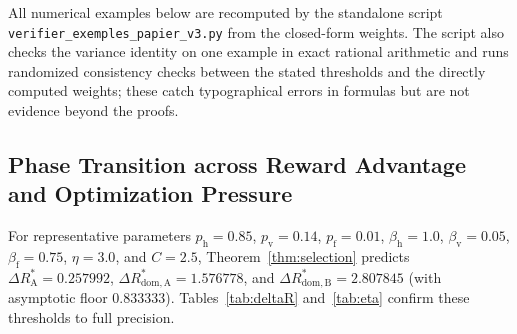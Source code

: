 \documentclass[11pt,a4paper]{article}
\begin{document}
{\sloppy All numerical examples below are recomputed by the standalone script \texttt{verifier\_exemples\_papier\_v3.py} from the closed-form weights. The script also checks the variance identity on one example in exact rational arithmetic and runs randomized consistency checks between the stated thresholds and the directly computed weights; these catch typographical errors in formulas but are not evidence beyond the proofs.\par}

\subsection{Phase Transition across Reward Advantage and Optimization Pressure}

For representative parameters $p_{\mathrm{h}} = 0.85$, $p_{\mathrm{v}} = 0.14$, $p_{\mathrm{f}} = 0.01$, $\beta_{\mathrm{h}} = 1.0$, $\beta_{\mathrm{v}} = 0.05$, $\beta_{\mathrm{f}} = 0.75$, $\eta = 3.0$, and $C = 2.5$, Theorem~\ref{thm:selection} predicts $\Delta R_{\mathrm{A}}^* = 0.257992$, $\Delta R_{\mathrm{dom, A}}^* = 1.576778$, and $\Delta R_{\mathrm{dom, B}}^* = 2.807845$ (with asymptotic floor $0.833333$). Tables~\ref{tab:deltaR} and~\ref{tab:eta} confirm these thresholds to full precision.
\end{document}

